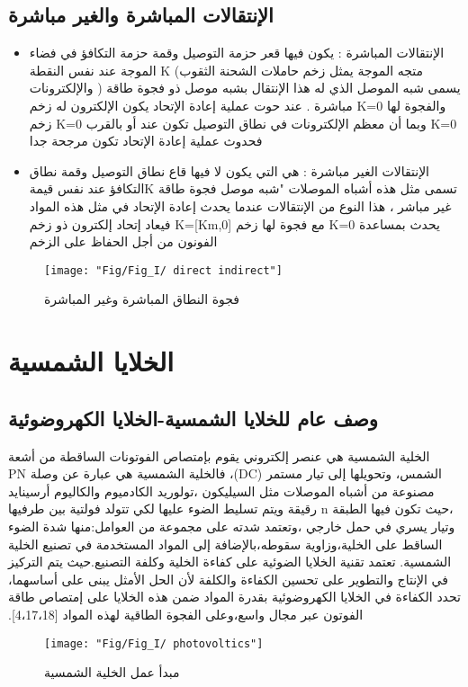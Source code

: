 	\subsection{ الإنتقالات المباشرة والغير مباشرة}
	\begin{itemize}
		\item  الإنتقالات المباشرة :
		يكون فيها قعر حزمة التوصيل وقمة حزمة التكافؤ في فضاء الموجة عند نفس النقطة K (متجه الموجة يمثل زخم حاملات الشحنة الثقوب والإلكترونات ) يسمى شبه الموصل الذي له هذا الإنتقال بشبه موصل ذو فجوة طاقة مباشرة . عند حوت عملية إعادة الإتحاد يكون الإلكترون له زخم K=0 والفجوة لها زخم K=0 وبما أن معظم الإلكترونات في نطاق التوصيل تكون عند أو بالقرب  K=0 فحدوث عملية إعادة الإتحاد تكون مرجحة جدا
		\item  الإنتقالات الغير مباشرة :
		هي التي يكون لا  فيها قاع نطاق التوصيل وقمة نطاق التكافؤ عند نفس قيمةK تسمى مثل هذه أشباه الموصلات "شبه موصل فجوة طاقة غير مباشر ، هذا النوع من الإنتقالات عندما يحدث إعادة الإتحاد في مثل هذه المواد فيعاد إتحاد إلكترون ذو زخم K=[Km,0] مع فجوة لها زخم K=0  يحدث بمساعدة الفونون من أجل الحفاظ على  الزخم
	 \cite{a7}
	\end{itemize}
	\begin{figure}[h!]
		\centering
		\texttt{[image: "Fig/Fig\_I/ direct indirect"]}
		\caption{فجوة النطاق المباشرة وغير المباشرة}
		\label{fig:-direct-indirect}
	\end{figure}
	\FloatBarrier
	\section{ الخلايا الشمسية}
	\subsection{ وصف عام للخلايا الشمسية-الخلايا الكهروضوئية  }
	‫الخلية الشمسية هي عنصر إلكتروني يقوم بإمتصاص الفوتونات الساقطة من أشعة الشمس، وتحويلها إلى تيار مستمر (DC)،  
	فالخلية الشمسية هي عبارة عن وصلة PN مصنوعة من أشباه الموصلات مثل السيليكون ،تولوريد الكادميوم والكاليوم أرسينايد ،حيث تكون فيها الطبقة n رقيقة ويتم تسليط الضوء عليها لكي تتولد فولتية بين طرفيها وتيار يسري في حمل خارجي ،وتعتمد شدته على مجموعة من العوامل:منها شدة الضوء الساقط على الخلية،وزاوية سقوطه،بالإضافة إلى المواد المستخدمة في تصنيع الخلية الشمسية.
	تعتمد تقنية الخلايا الضوئية على كفاءة الخلية وكلفة التصنيع.حيث يتم التركيز في الإنتاج والتطوير على تحسين الكفاءة والكلفة ﻷن الحل الأمثل يبنى على أساسهما، تحدد الكفاءة في الخلايا الكهروضوئية بقدرة المواد ضمن هذه الخلايا على إمتصاص طاقة الفوتون عبر مجال واسع،وعلى الفجوة الطاقية لهذه المواد [4،17،18].
	\begin{figure}[h!]
		\centering
		\texttt{[image: "Fig/Fig\_I/ photovoltics"]}
		\caption{مبدأ عمل الخلية الشمسية}
		\label{fig:-photovoltics}
	\end{figure}
	\FloatBarrier
